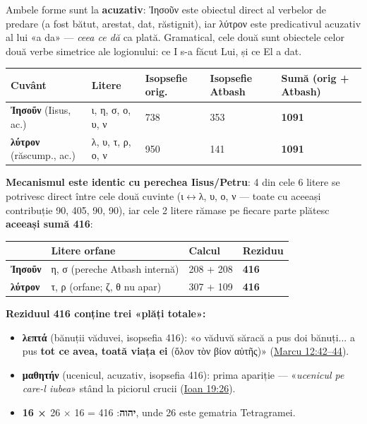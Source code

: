 \documentclass[12pt,a4paper,twoside,openany]{book}
\begin{document}
Ambele forme sunt la \textbf{acuzativ}: Ἰησοῦν este obiectul direct al verbelor de predare (a fost bătut, arestat, dat, răstignit), iar λύτρον este predicativul acuzativ al lui «a da» --- \textit{ceea ce dă} ca plată. Gramatical, cele două sunt obiectele celor două verbe simetrice ale logionului: ce I s-a făcut Lui, și ce El a dat.

\begin{center}
\small
\begin{tabular}{L{2.8cm}L{3.2cm}C{2.5cm}C{2.2cm}C{3cm}}
\toprule
{}
\textbf{Cuvânt} & \textbf{Litere} & \textbf{Isopsefie orig.} & \textbf{Isopsefie Atbash} & \textbf{Sumă (orig + Atbash)} \\
\midrule
\textbf{Ἰησοῦν} (Iisus, ac.) & ι, η, σ, ο, υ, ν & 738 & 353 & \textbf{\textcolor{primary}{1091}} \\
\textbf{λύτρον} (răscump., ac.) & λ, υ, τ, ρ, ο, ν & 950 & 141 & \textbf{\textcolor{primary}{1091}} \\
\bottomrule
\end{tabular}
\end{center}

\textbf{Mecanismul este identic cu perechea Iisus/Petru}: 4 din cele 6 litere se potrivesc direct între cele două cuvinte (ι$\leftrightarrow$λ, υ, ο, ν --- toate cu aceeași contribuție 90, 405, 90, 90), iar cele 2 litere rămase pe fiecare parte plătesc \textbf{aceeași sumă 416}:

\begin{center}
\footnotesize
\begin{tabular}{L{3cm}C{3cm}C{3cm}C{2cm}}
\toprule
{}
\textbf{} & \textbf{Litere orfane} & \textbf{Calcul} & \textbf{Reziduu} \\
\midrule
\textbf{Ἰησοῦν} & η, σ (pereche Atbash internă) & 208 + 208 & \textbf{\textcolor{primary}{416}} \\
\textbf{λύτρον} & τ, ρ (orfane; ζ, θ nu apar) & 307 + 109 & \textbf{\textcolor{primary}{416}} \\
\bottomrule
\end{tabular}
\end{center}

\textbf{Reziduul 416 conține trei «plăți totale»:}
\begin{itemize}
\item \textbf{λεπτά} (bănuții văduvei, isopsefia 416): «o văduvă săracă a pus doi bănuți... a pus \textbf{tot ce avea, toată viața ei} (ὅλον τὸν βίον αὐτῆς)» (\href{https://bibliaortodoxa.ro/carte.php?id=53\&cap=12\#42}{Marcu 12:42--44}).
\item \textbf{μαθητήν} (ucenicul, acuzativ, isopsefia 416): prima apariție --- «\textit{ucenicul pe care-l iubea}» stând la piciorul crucii (\href{https://bibliaortodoxa.ro/carte.php?id=35\&cap=19\#26}{Ioan 19:26}).
\item \textbf{16 × יהוה}: 416 = 16 $\times$ 26, unde 26 este gematria Tetragramei.
\end{itemize}
\end{document}

